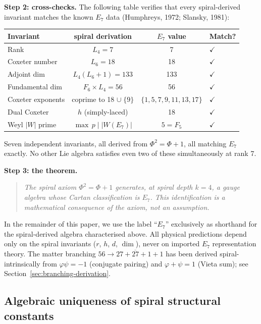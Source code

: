 \documentclass[12pt,a4paper]{article}
\begin{document}
\textbf{Step 2: cross-checks.} The following table verifies that every spiral-derived invariant matches the known $E_7$ data (Humphreys, 1972; Slansky, 1981):
\begin{center}
\small
\begin{tabular}{|l|c|c|l|}
\hline
\textbf{Invariant} & \textbf{spiral derivation} & \textbf{$E_7$ value} & \textbf{Match?} \\
\hline
Rank & $L_4 = 7$ & 7 & $\checkmark$ \\
Coxeter number & $L_6 = 18$ & 18 & $\checkmark$ \\
Adjoint dim & $L_4(L_6{+}1) = 133$ & 133 & $\checkmark$ \\
Fundamental dim & $F_6 \times L_4 = 56$ & 56 & $\checkmark$ \\
Coxeter exponents & coprime to 18 $\cup\;\{9\}$ & $\{1,5,7,9,11,13,17\}$ & $\checkmark$ \\
Dual Coxeter & $h$ (simply-laced) & 18 & $\checkmark$ \\
Weyl $|W|$ prime & $\max\,p \mid |W(E_7)|$ & $5 = F_5$ & $\checkmark$ \\
\hline
\end{tabular}
\end{center}
Seven independent invariants, all derived from $\Phi^2 = \Phi + 1$, all matching $E_7$ exactly. No other Lie algebra satisfies even two of these simultaneously at rank 7.

\textbf{Step 3: the theorem.}

\begin{quote}
\textit{The spiral axiom $\Phi^2 = \Phi + 1$ generates, at spiral depth $k = 4$, a gauge algebra whose Cartan classification is $E_7$. This identification is a mathematical consequence of the axiom, not an assumption.}
\end{quote}

\noindent In the remainder of this paper, we use the label ``$E_7$'' exclusively as shorthand for the spiral-derived algebra characterised above. All physical predictions depend only on the spiral invariants ($r$, $h$, $d$, $\dim$), never on imported $E_7$ representation theory. The matter branching $56 \to 27 + \overline{27} + 1 + 1$ has been derived spiral-intrinsically from $\varphi\psi = -1$ (conjugate pairing) and $\varphi + \psi = 1$ (Vieta sum); see Section~\ref{sec:branching-derivation}.

\subsection{Algebraic uniqueness of spiral structural constants}
\label{sec:spiral-uniqueness}
\end{document}
